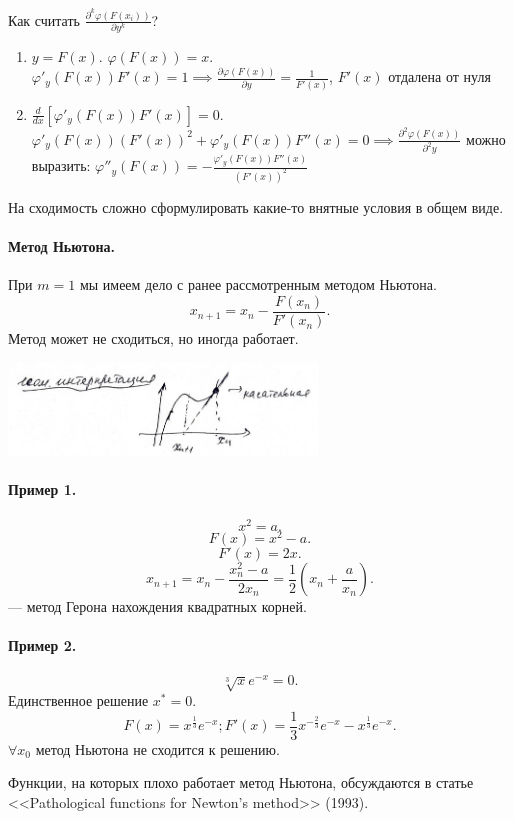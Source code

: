 Как считать $\frac{\partial^k \varphi(F(x_i))}{\partial y^k}$?
\begin{enumerate}
	\item $y=F(x)$. $\varphi(F(x)) = x$. $\varphi'_y (F(x))F'(x) = 1 \implies \frac{\partial \varphi (F(x))}{\partial y} = \frac{1}{F'(x)}$, $F'(x)$ отдалена от нуля
	\item $\frac{d}{dx}[\varphi'_y (F(x))F'(x)] = 0$. $\varphi'_y (F(x))(F'(x))^2 + \varphi'_y (F(x))F''(x) = 0 \implies \frac {\partial^2 \varphi(F(x))}{\partial^2 y}$ можно выразить: $\varphi''_y (F(x)) = - \frac {\varphi'_y(F(x))F''(x)}{(F'(x))^2}$
\end{enumerate}


На сходимость сложно сформулировать какие-то внятные условия в общем виде.

\paragraph{Метод Ньютона.}
При $m=1$ мы имеем дело с ранее рассмотренным методом Ньютона. 
\[
	x_{n+1} = x_n - \frac{F(x_n)}{F'(x_n)}.
\]
Метод может не сходиться, но иногда работает.
\begin{center}
	\includegraphics[width=8.2cm]{../figures/lection_1/figure_2.png}
\end{center}

\paragraph{Пример 1.}
\[
	x^2=a.
\]
\[
	F(x) = x^2 - a.
\]
\[
	F'(x) = 2x.
\]
\[
	x_{n+1} = x_n - \frac{x^2_n - a}{2x_n} = \frac{1}{2}(x_n+\frac{a}{x_n}).
\] --- метод Герона нахождения квадратных корней.

\paragraph{Пример 2.}
\[
	\sqrt[3]{x}e^{-x} = 0.
\]
Единственное решение $x^* = 0$. 
\[
	F(x) = x^{\frac{1}{3}} e^{-x}; F'(x) = \frac{1}{3}x^{-\frac{2}{3}}e^{-x} - x^{\frac{1}{3}}e^{-x}.
\] 
$\forall x_0$ метод Ньютона не сходится к решению.

Функции, на которых плохо работает метод Ньютона, обсуждаются в статье <<Pathological functions for Newton's method>> (1993).


